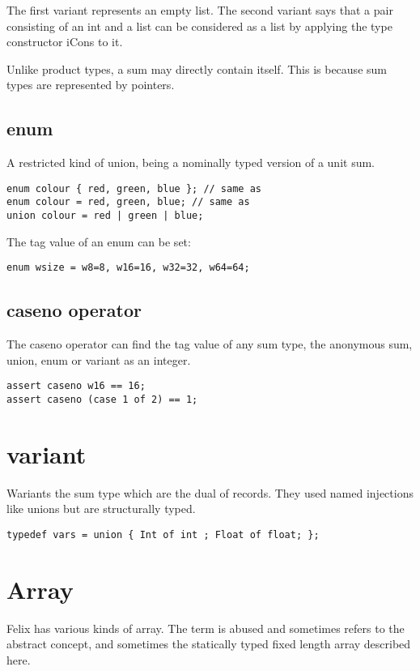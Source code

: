 \documentclass[oneside]{book}
\begin{document}
The first variant represents an empty list. The second variant
says that a pair consisting of an int and a list can be considered
as a list by applying the type constructor iCons to it.

Unlike product types, a sum may directly contain itself.
This is because sum types are represented by pointers.

\subsection{enum}
A restricted kind of union, being a nominally typed version
of a unit sum.

\begin{verbatim}
enum colour { red, green, blue }; // same as
enum colour = red, green, blue; // same as
union colour = red | green | blue;
\end{verbatim}


The tag value of an enum can be set:

\begin{verbatim}
enum wsize = w8=8, w16=16, w32=32, w64=64;
\end{verbatim}


\subsection{caseno operator}
The caseno operator can find the tag value of any sum type,
the anonymous sum, union, enum or variant as an integer.

\begin{verbatim}
assert caseno w16 == 16;
assert caseno (case 1 of 2) == 1;
\end{verbatim}


\section{variant}
Wariants the sum type which are the dual of records.
They used named injections like unions but are structurally typed.

\begin{verbatim}
typedef vars = union { Int of int ; Float of float; };
\end{verbatim}


\section{Array}
Felix has various kinds of array. The term is abused and sometimes
refers to the abstract concept, and sometimes the statically
typed fixed length array described here.
\end{document}
